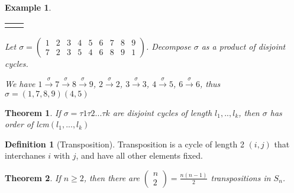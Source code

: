 \documentclass{article}
\theoremstyle{MyNonumberplain}
\theoremstyle{break}
\newcommand{\nline}{\begin{tabular}{ll}&\\\end{tabular}}
\theoremstyle{break}
\newtheorem{theorem}{Theorem}[section]
\newtheorem{example}{Example}[section]
\theoremstyle{break}
\theoremstyle{definition}
\theoremstyle{break}
\newtheorem{definition}{Definition}[section]
\begin{document}
\begin{expbox}
    \begin{example}

        \nline

        Let $\sigma = \left(\begin{array}{ccccccccc}
            1 & 2 & 3 & 4 & 5 & 6 & 7 & 8 & 9\\
            7 & 2 & 3 & 5 & 4 & 6 & 8 & 9 & 1
          \end{array}\right)$. Decompose $\sigma$ as a product of disjoint cycles.

          \begin{ansbox}
            We have $1 \xrightarrow{\sigma} 7 \xrightarrow{\sigma} 8 \xrightarrow{\sigma}
            9$, $2 \xrightarrow{\sigma} 2$, $3 \xrightarrow{\sigma} 3$, $4
            \xrightarrow{\sigma} 5$, $6 \xrightarrow{\sigma} 6$, thus $\sigma = (1, 7, 8,
            9) (4, 5)$
  
          \end{ansbox}
          
    \end{example}
\end{expbox}

\begin{thmbox}
    \begin{theorem}
        If $\sigma=\tau1\tau2...\tau k$ are disjoint cycles of length $l_1,..,l_k$, then $\sigma$ has order of lcm$(l_1,...,l_k)$
    \end{theorem}
\end{thmbox}

\begin{defbox}
    \begin{definition}[Transposition]
        Transposition is a cycle of length 2 $(i,j)$ that interchanes $i$ with $j$, and have all other elements fixed. 
    \end{definition}
\end{defbox}


\begin{thmbox}
    \begin{theorem}
        If $n\geq 2$, then there are $\left(\begin{array}{c}n\\2\end{array}\right)=\frac{n(n-1)}{2}$ transpositions in $S_n$. 
    \end{theorem}
\end{thmbox}
\end{document}
